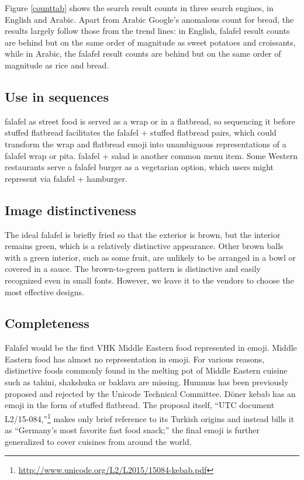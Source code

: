 \documentclass[a4paper,10pt]{article}
\begin{document}
Figure \ref{counttab} shows the search result counts in three search engines, in English
and Arabic. Apart from Arabic Google's anomalous count for bread, the results largely
follow those from the trend lines: in English, falafel result counts are behind but
on the same order of magnitude as sweet potatoes and croissants, while in Arabic, the
falafel result counts are behind but on the same order of magnitude as rice and bread.


\subsection{Use in sequences}\label{seqsec}
{\sc falafel} as street food is served as a wrap or in a flatbread, so sequencing it before {\sc stuffed flatbread}
facilitates the {\sc falafel}
+ {\sc stuffed flatbread} pairs, which could transform the wrap and flatbread emoji
into unambiguous representations of a falafel wrap or pita. {\sc falafel} + {\sc salad} is
another common menu item. Some Western restaurants serve a falafel burger as a vegetarian option,
which users might represent via {\sc falafel} + {\sc hamburger}.


\subsection{Image distinctiveness}
The ideal falafel is briefly fried so that the exterior is brown, but the interior
remains green, which is a relatively distinctive appearance. Other brown balls with
a green interior, such as some fruit, are unlikely to be arranged in a bowl or covered
in a sauce. The brown-to-green pattern is distinctive and easily recognized even in
small fonts. However, we leave it to the vendors to choose the most effective designs.

\subsection{Completeness}
Falafel would be the first VHK Middle Eastern food represented in emoji.
Middle Eastern food has almost no representation in emoji. For various reasons, distinctive foods
commonly found in the melting pot of Middle Eastern cuisine such as tahini, shakshuka or
baklava are missing. 
{\sc Hummus} has been previously proposed and rejected by the Unicode Technical Committee. 
 D\"oner kebab has an emoji in the form
of {\sc stuffed flatbread}. The proposal itself, ``UTC document
L2/15-084,''\footnote{\url{http://www.unicode.org/L2/L2015/15084-kebab.pdf}} makes
only brief reference to its Turkish origins and instead bills it as ``Germany's most
favorite fast food snack;'' the final emoji is further generalized to cover cuisines from around the world.
\end{document}
